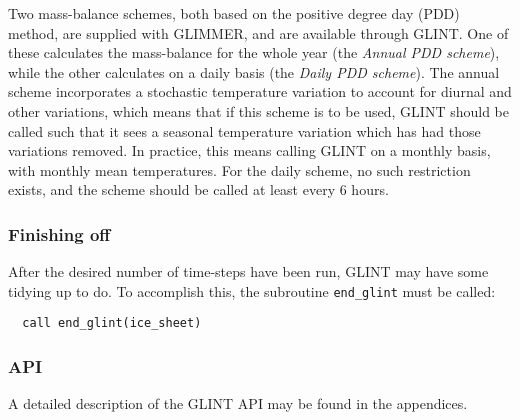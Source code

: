 %
Two mass-balance schemes, both based on the positive degree day (PDD) method,
are supplied with GLIMMER, and are available through GLINT. One of these calculates the mass-balance for the
whole year (the \emph{Annual PDD scheme}), while the other calculates on a
daily basis (the \emph{Daily PDD scheme}). The annual scheme incorporates a
stochastic temperature variation to account for diurnal and other variations,
which means that if this scheme is to be used, GLINT should be called such
that it sees a seasonal temperature variation which has had those variations
removed. In practice, this means calling GLINT on a monthly basis, with
monthly mean temperatures. For the daily scheme, no such restriction exists,
and the scheme should be called at least every 6 hours.
%
\subsubsection{Finishing off}
%
After the desired number of time-steps have been run, GLINT may have some
tidying up to do. To accomplish this, the subroutine \texttt{end\_glint}
must be called:
%
\begin{verbatim}
  call end_glint(ice_sheet)
\end{verbatim}
%
\subsubsection{API}
%
A detailed description of the GLINT API may be found in the appendices.
%
